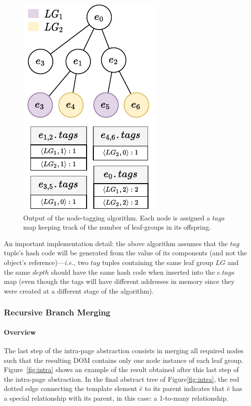 \documentclass[sigconf,authordraft]{acmart}
\theoremstyle{definition}
\begin{document}
\begin{figure}[ht]
  \centering
  \includegraphics[width=0.5\linewidth]{explanations/node-tagging}
  \caption{Output of the node-tagging algorithm. Each node is assigned a $tags$ map keeping track of the number of leaf-groups in its offspring.}
  \label{fig:node_tagging}
\end{figure}

An important implementation detail: the above algorithm assumes that the $tag$ tuple's hash code will be generated from the value of its components (and not the object's reference)---\emph{i.e.}, two $tag$ tuples containing the same leaf group $LG$ and the same $depth$ should have the same hash code when inserted into the $e.tags$ map (even though the tags will have different addresses in memory since they were created at a different stage of the algorithm).

\subsubsection{Recursive Branch Merging}
\paragraph{Overview}
The last step of the intra-page abstraction consists in merging all required nodes such that the resulting DOM contains only one node instance of each leaf group. 
Figure~\ref{fig:intra} shows an example of the result obtained after this last step of the intra-page abstraction. 
In the final abstract tree of Figure\ref{fig:intra}, the red dotted edge connecting the template element $\hat{e}$ to its parent indicates that $\hat{e}$ has a special relationship with its parent, in this case: a 1-to-many relationship.
\end{document}
